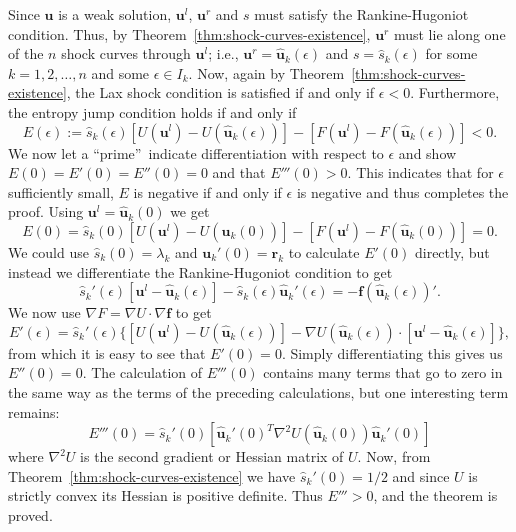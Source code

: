 \begin{Proof}
Since $\bm{u}$ is a weak solution, $\bm{u}^l$, $\bm{u}^r$ and $s$ must satisfy the Rankine-Hugoniot condition. Thus, by Theorem~\ref{thm:shock-curves-existence}, $\bm{u}^r$ must lie along one of the $n$ shock curves through $\bm{u}^l$; i.e., $\bm{u}^r=\hat{\bm{u}}_k(\epsilon)$ and $s=\hat s_k(\epsilon)$ for some $k=1,2,\ldots,n$ and some $\epsilon\in I_k$. Now, again by Theorem~\ref{thm:shock-curves-existence}, the Lax shock condition is satisfied if and only if $\epsilon<0$. Furthermore, the entropy jump condition holds if and only if
\begin{equation}\label{eq:entropy-shock-curve-functional}
E(\epsilon):=\hat s_k(\epsilon)[U(\bm{u}^l)-U(\hat{\bm{u}}_k(\epsilon))]-[F(\bm{u}^l)-F(\hat{\bm{u}}_k(\epsilon))]<0.
\end{equation}
We now let a \textquotedblleft prime\textquotedblright\ indicate differentiation with respect to $\epsilon$ and show $E(0)=E'(0)=E''(0)=0$ and that $E'''(0)>0$. This indicates that for $\epsilon$ sufficiently small, $E$ is negative if and only if $\epsilon$ is negative and thus completes the proof. Using $\bm{u}^l=\hat{\bm{u}}_k(0)$ we get
\begin{equation}\label{eq:entropy-shock-functional-at-zero}
E(0)=\hat s_k(0)[U(\bm{u}^l)-U(\hat{\bm{u}}_k(0))]-[F(\bm{u}^l)-F(\hat{\bm{u}}_k(0))]=0.
\end{equation}
We could use $\hat s_k(0)=\lambda_k$ and $\bm{u}_k'(0)=\bm{r}_k$ to calculate $E'(0)$ directly, but instead we differentiate the Rankine-Hugoniot condition to get
\begin{equation}\label{eq:shock-rh-parameter-derivative}
\hat s_k'(\epsilon)[\bm{u}^l-\hat{\bm{u}}_k(\epsilon)]-\hat s_k(\epsilon)\hat{\bm{u}}_k'(\epsilon)=-\bm{f}(\hat{\bm{u}}_k(\epsilon))'.
\end{equation}
We now use $\nabla F=\nabla U\cdot\nabla\bm{f}$ to get
\begin{equation}\label{eq:entropy-shock-functional-first-derivative}
E'(\epsilon)=\hat s_k'(\epsilon)\{[U(\bm{u}^l)-U(\hat{\bm{u}}_k(\epsilon))]-\nabla U(\hat{\bm{u}}_k(\epsilon))\cdot[\bm{u}^l-\hat{\bm{u}}_k(\epsilon)]\},
\end{equation}
from which it is easy to see that $E'(0)=0$. Simply differentiating this gives us $E''(0)=0$. The calculation of $E'''(0)$ contains many terms that go to zero in the same way as the terms of the preceding calculations, but one interesting term remains:
\begin{equation}\label{eq:entropy-shock-functional-third-derivative}
E'''(0)=\hat s_k'(0)[\hat{\bm{u}}_k'(0)^T\nabla^2U(\hat{\bm{u}}_k(0))\hat{\bm{u}}_k'(0)]
\end{equation}
where $\nabla^2U$ is the second gradient or Hessian matrix of $U$. Now, from Theorem~\ref{thm:shock-curves-existence} we have $\hat s_k'(0)=1/2$ and since $U$ is strictly convex its Hessian is positive definite. Thus $E'''>0$, and the theorem is proved.
\end{Proof}
